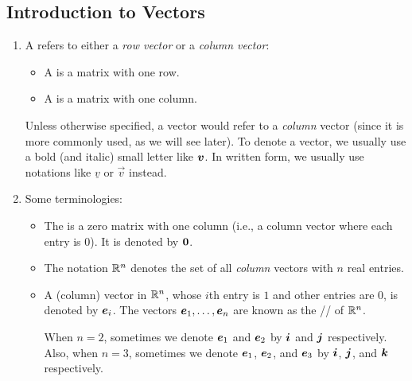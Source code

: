 \subsection{Introduction to Vectors}
\begin{enumerate}
\item A  refers to either a \emph{row vector} or a \emph{column
vector}:
\begin{itemize}
\item A  is a matrix with one row.
\item A  is a matrix with one column.
\end{itemize}
Unless otherwise specified, a vector would refer to a \emph{column} vector
(since it is more commonly used, as we will see later). To denote a vector, we
usually use a bold (and italic) small letter like \(\vb*{v}\). In written
form, we usually use notations like \(\underline{v}\) or \(\vec{v}\) instead.

\item Some terminologies:
\begin{itemize}
\item The  is a zero matrix with one column (i.e., a column
vector where each entry is \(0\)). It is denoted by \(\vb*{0}\).
\item The notation \(\mathbb{R}^n\) denotes the set of all \emph{column} vectors with \(n\)
real entries.
\item A (column) vector in \(\mathbb{R}^n\), whose \(i\)th entry is \(1\) and other
entries are \(0\), is denoted by \(\vb*{e}_{i}\). The vectors
\(\vb*{e}_{1},\dotsc,\vb*{e}_{n}\) are known as the // of
\(\mathbb{R}^n\).

\begin{note}
When \(n=2\), sometimes we denote \(\vb*{e}_{1}\) and \(\vb*{e}_{2}\) by
\(\vb*{i}\) and \(\vb*{j}\) respectively. Also, when \(n=3\), sometimes we
denote \(\vb*{e}_{1}\), \(\vb*{e}_{2}\), and \(\vb*{e}_{3}\) by
\(\vb*{i}\), \(\vb*{j}\), and \(\vb*{k}\) respectively.
\end{note}
\end{itemize}


\end{enumerate}
